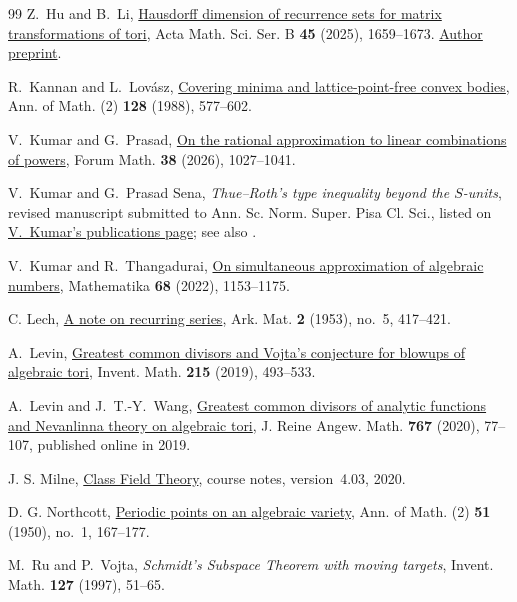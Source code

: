 \documentclass[11pt,a4paper,reqno]{amsart}
\theoremstyle{definition}
\theoremstyle{remark}
\numberwithin{equation}{section}
\begin{document}
\begin{thebibliography}{99}
 Z.~Hu and B.~Li, \href{https://doi.org/10.1007/s10473-025-0422-1}{Hausdorff dimension of recurrence sets for matrix transformations of tori}, Acta Math. Sci. Ser. B \textbf{45} (2025), 1659--1673. \href{https://arxiv.org/abs/2402.04810}{Author preprint}.

 R.~Kannan and L.~Lov\'asz, \href{https://annals.math.princeton.edu/1988/128-3/p06}{Covering minima and lattice-point-free convex bodies}, Ann. of Math. (2) \textbf{128} (1988), 577--602.

 V.~Kumar and G.~Prasad, \href{https://doi.org/10.1515/forum-2024-0441}{On the rational approximation to linear combinations of powers}, Forum Math. \textbf{38} (2026), 1027--1041.

 V.~Kumar and G.~Prasad Sena, \emph{Thue--Roth's type inequality beyond the \(S\)-units}, revised manuscript submitted to Ann. Sc. Norm. Super. Pisa Cl. Sci., listed on \href{https://sites.google.com/view/veekeshkumar/publications}{V.~Kumar's publications page}; see also \cite{HRI}.

 V.~Kumar and R.~Thangadurai, \href{https://doi.org/10.1112/mtk.12161}{On simultaneous approximation of algebraic numbers}, Mathematika \textbf{68} (2022), 1153--1175.

 C. Lech,
\href{https://doi.org/10.1007/BF02590997}{A note on recurring series},
Ark. Mat. \textbf{2} (1953), no.~5, 417--421.

 A.~Levin, \href{https://doi.org/10.1007/s00222-018-0831-z}{Greatest common divisors and Vojta's conjecture for blowups of algebraic tori}, Invent. Math. \textbf{215} (2019), 493--533.

 A.~Levin and J.~T.-Y.~Wang, \href{https://doi.org/10.1515/crelle-2019-0033}{Greatest common divisors of analytic functions and Nevanlinna theory on algebraic tori}, J. Reine Angew. Math. \textbf{767} (2020), 77--107, published online in 2019.

 J. S. Milne,
\href{https://www.jmilne.org/math/CourseNotes/CFT.pdf}{Class Field Theory},
course notes, version~4.03, 2020.

 D. G. Northcott,
\href{https://doi.org/10.2307/1969504}{Periodic points on an algebraic variety},
Ann. of Math. (2) \textbf{51} (1950), no.~1, 167--177.

 M.~Ru and P.~Vojta, \emph{Schmidt's Subspace Theorem with moving targets}, Invent. Math. \textbf{127} (1997), 51--65.


\end{thebibliography}
\end{document}
